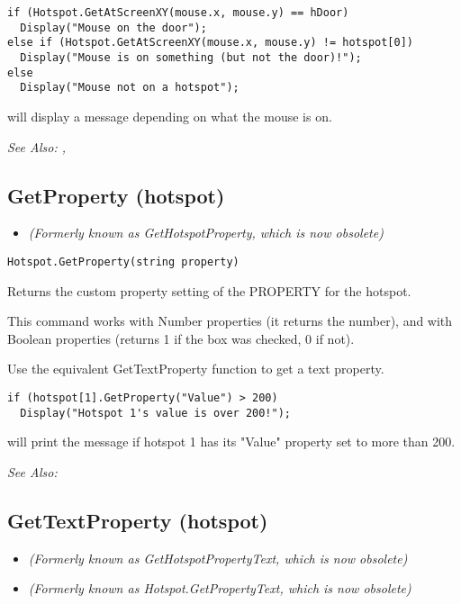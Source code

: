 \begin{verbatim}
if (Hotspot.GetAtScreenXY(mouse.x, mouse.y) == hDoor)
  Display("Mouse on the door");
else if (Hotspot.GetAtScreenXY(mouse.x, mouse.y) != hotspot[0])
  Display("Mouse is on something (but not the door)!");
else
  Display("Mouse not on a hotspot");
\end{verbatim}
will display a message depending on what the mouse is on.

\it{See Also:} , 


\subsection{GetProperty (hotspot)}\label{Hotspot.GetProperty}%

\begin{itemize}
\item \it{(Formerly known as GetHotspotProperty, which is now obsolete)}
\end{itemize}

\begin{verbatim}
Hotspot.GetProperty(string property)
\end{verbatim}
Returns the custom property setting of the PROPERTY for the hotspot.

This command works with Number properties (it returns the number), and with Boolean
properties (returns 1 if the box was checked, 0 if not).

Use the equivalent GetTextProperty function to get a text property.

\begin{verbatim}
if (hotspot[1].GetProperty("Value") > 200)
  Display("Hotspot 1's value is over 200!");
\end{verbatim}
will print the message if hotspot 1 has its "Value" property set to more than 200.

\it{See Also:} 


\subsection{GetTextProperty (hotspot)}\label{Hotspot.GetTextProperty}%

\begin{itemize}
\item \it{(Formerly known as GetHotspotPropertyText, which is now obsolete)}
\item \it{(Formerly known as Hotspot.GetPropertyText, which is now obsolete)}
\end{itemize}

